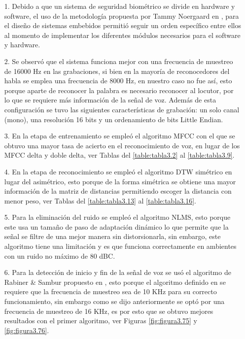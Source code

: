 \begin{enumerate}
\item[1.]Debido a que un sistema de seguridad biométrico se divide en hardware y software, el uso de la metodología propuesta por Tammy Noergaard en \citep{tammy}, para el diseño de sistemas embebidos permitió seguir un orden específico entre ellos al momento de implementar los diferentes módulos necesarios para el software y hardware.

\item[2.]Se observó que el sistema funciona mejor con una frecuencia de muestreo de 16000 Hz en las grabaciones, si bien en la mayoría de reconocedores del habla se emplea una frecuencia de 8000 Hz, en nuestro caso no fue así, esto porque aparte de reconocer la palabra es necesario reconocer al locutor, por lo que se requiere más información de la señal de voz. Además de esta configuración se tuvo las siguientes características de grabación: un solo canal (mono), una resolución 16 bits y un ordenamiento de bits Little Endian.

\item[3.]En la etapa de entrenamiento se empleó el algoritmo MFCC con el que se obtuvo una mayor tasa de acierto en el reconocimiento de voz, en lugar de los MFCC delta y doble delta, ver Tablas del \ref{table:tabla3.2} al \ref{table:tabla3.9}.

\item[4.]En la etapa de reconocimiento se empleó el algoritmo DTW simétrico en lugar del asimétrico, esto porque de la forma simétrica se obtiene una mayor información de la matriz de distancias permitiendo escoger la distancia con menor peso, ver Tablas del \ref{table:tabla3.13} al \ref{table:tabla3.16}.

\item[5.]Para la eliminación del ruido se empleó el algoritmo NLMS, esto porque este usa un tamaño de paso de adaptación dinámico lo que permite que la señal se filtre de una mejor manera sin distorsionarla, sin embargo, este algoritmo tiene una limitación y es que funciona correctamente en ambientes con un ruido no máximo de 80 dBC.

\item[6.]Para la detección de inicio y fin de la señal de voz se usó el algoritmo de Rabiner \& Sambur propuesto en \citep{unam}, esto porque el algoritmo definido en \citep{rabiner} se requiere que la frecuencia de muestreo sea de 10 KHz para su correcto funcionamiento, sin embargo como se dijo anteriormente se optó por una frecuencia de muestreo de 16 KHz, es por esto que se obtuvo mejores resultados con el primer algoritmo, ver Figuras \ref{fig:figura3.75} y \ref{fig:figura3.76}.


\end{enumerate}
